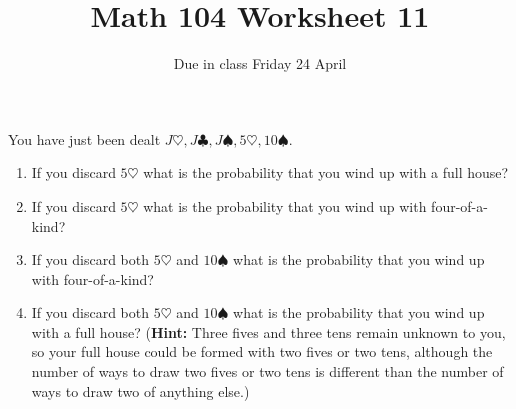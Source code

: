 \documentclass[12pt]{article}
\author{}\date{Due in class Friday 24 April}
\title{Math 104 Worksheet 11}\author{}
\begin{document}
\maketitle
\pagestyle{empty}
You have just been dealt
$J\heartsuit,J\clubsuit,J\spadesuit,5\heartsuit,10\spadesuit$.
\begin{enumerate}
\item If you discard $5\heartsuit$ what is the probability
that you wind up with a full house?
\item If you discard $5\heartsuit$ what is the probability
that you wind up with four-of-a-kind?
\item If you discard both $5\heartsuit$ and $10\spadesuit$
what is the probability that you wind up with four-of-a-kind?
\item If you discard both $5\heartsuit$ and $10\spadesuit$
what is the probability that you wind up with a full house?
({\bf Hint:} Three fives and three
tens remain unknown to you, so your full house could be formed
with two fives or two tens, although the number of ways
to draw two fives or two tens is different than the number
of ways to draw two of anything else.)
\end{enumerate}
\end{document}
